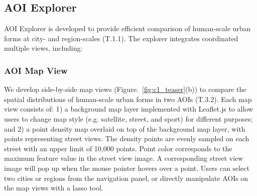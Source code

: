 \subsection{AOI Explorer}
\label{ssec:c1_aoi_explorer}
AOI Explorer is developed to provide efficient comparison of human-scale urban forms at city- and region-scales (T.1.1).
The explorer integrates coordinated multiple views, including:

\subsubsection{AOI Map View}
\label{sssec:c1_aoi_map_view}

We develop side-by-side map views (Figure.~\ref{fig:c1_teaser}(b)) to compare the spatial distributions of human-scale urban forms in two AOIs (T.3.2).
Each map view consists of:
1) a background map layer implemented with Leaflet.js to allow users to change map style (e.g. satellite, street, and sport) for different purposes;
and 2) a point density map overlaid on top of the background map layer, with points representing street views.
The density points are evenly sampled on each street with an upper limit of 10,000 points.
Point color corresponds to the maximum feature value in the street view image.
A corresponding street view image will pop up when the mouse pointer hovers over a point.
Users can select two cities or regions from the navigation panel, or directly manipulate AOIs on the map views with a lasso tool.

